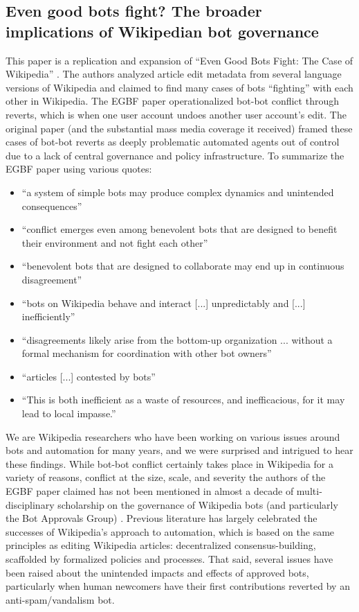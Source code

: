 \documentclass[format=acmsmall, review=false, screen=true]{acmart}%
\begin{document}
\subsection{Even good bots fight? The broader implications of Wikipedian bot governance}  
This paper is a replication and expansion of ``Even Good Bots Fight: The Case of Wikipedia'' \cite{Tsvetkova2017}. The authors analyzed article edit metadata from several language versions of Wikipedia and claimed to find many cases of bots ``fighting'' with each other in Wikipedia. The EGBF paper operationalized bot-bot conflict through reverts, which is when one user account undoes another user account's edit. The original paper (and the substantial mass media coverage it received) framed these cases of bot-bot reverts as deeply problematic automated agents out of control due to a lack of central governance and policy infrastructure. To summarize the EGBF paper using various quotes:

\begin{itemize}
\item ``a system of simple bots may produce complex dynamics and unintended consequences''  
\item ``conflict emerges even among benevolent bots that are designed to benefit their environment and not fight each other''
\item ``benevolent bots that are designed to collaborate may end up in continuous disagreement''  
\item ``bots on Wikipedia behave and interact [...] unpredictably and [...] inefficiently''  
\item ``disagreements likely arise from the bottom-up organization ... without a formal mechanism for coordination with other bot owners''  
\item ``articles [...] contested by bots''  
\item ``This is both inefficient as a waste of resources, and inefficacious, for it may lead to local impasse.''  
\end{itemize}

We are Wikipedia researchers who have been working on various issues around bots and automation for many years, and we were surprised and intrigued to hear these findings. While bot-bot conflict certainly takes place in Wikipedia for a variety of reasons, conflict at the size, scale, and severity the authors of the EGBF paper claimed has not been mentioned in almost a decade of multi-disciplinary scholarship on the governance of Wikipedia bots (and particularly the Bot Approvals Group) \cite{Bruckman2008, Geiger2011a, Halfaker2012, Kennedy2010, DeLaat2015,Livingstone2016, Niederer2010}. Previous literature has largely celebrated the successes of Wikipedia's approach to automation, which is based on the same principles as editing Wikipedia articles: decentralized consensus-building, scaffolded by formalized policies and processes. That said, several issues have been raised about the unintended impacts and effects of approved bots, particularly when human newcomers have their first contributions reverted by an anti-spam/vandalism bot. \cite{Geiger2012, Halfaker2013} 
\end{document}
